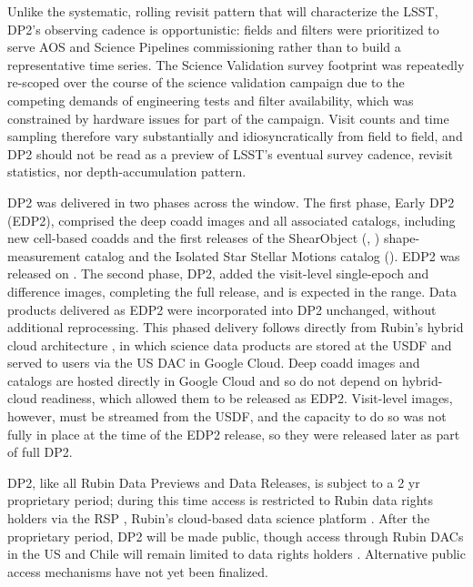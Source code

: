 Unlike the systematic, rolling revisit pattern that will characterize the \gls{LSST}, \gls{DP2}'s observing cadence is opportunistic: fields and filters were prioritized to serve \gls{AOS} and \gls{Science Pipelines} commissioning rather than to build a representative time series.
The Science \gls{Validation} survey footprint was repeatedly re-scoped over the course of the science validation campaign due to the competing demands of engineering tests and filter availability, which was constrained by hardware issues for part of the campaign.
\gls{Visit} counts and time sampling therefore vary substantially and idiosyncratically from field to field, and \gls{DP2} should not be read as a preview of \gls{LSST}'s eventual survey cadence, revisit statistics, nor depth-accumulation pattern.

\gls{DP2} was delivered in two phases across the \dptwodeliverywindow window.
The first phase, Early \gls{DP2} (\gls{EDP2}), comprised the deep coadd images and all associated catalogs, including new cell-based coadds and the first releases of the \gls{ShearObject} (, ) shape-measurement catalog and the Isolated Star Stellar Motions catalog ().
\gls{EDP2} was released on \edptworeleasedate.
The second phase, \gls{DP2}, added the visit-level single-\gls{epoch} and difference images, completing the full release, and is expected in the \dptworeleasedate range.
Data products delivered as \gls{EDP2} were incorporated into \gls{DP2} unchanged, without additional reprocessing.
This phased delivery follows directly from Rubin's hybrid cloud architecture \citep[][]{2024SPIE13101E..2BO}, in which science data products are stored at the \gls{USDF} and served to users via the US \gls{DAC} in Google Cloud.
Deep coadd images and catalogs are hosted directly in Google Cloud and so do not depend on hybrid-cloud readiness, which allowed them to be released as \gls{EDP2}.
Visit-level images, however, must be streamed from the \gls{USDF}, and the capacity to do so was not fully in place at the time of the \gls{EDP2} release, so they were released later as part of full \gls{DP2}.

\gls{DP2}, like all Rubin Data Previews and Data Releases, is subject to a 2 yr proprietary period; during this time access is restricted to Rubin data rights holders \citep[][]{rdo-013} via the \gls{RSP} \citep[][]{LSE-319}, Rubin's cloud-based data science platform \citep[][]{LSE-319}.
After the proprietary period, \gls{DP2} will be made public, though access through Rubin \gls{DAC}s in the US and Chile will remain limited to data rights holders \citep[][]{rdo-013}.
Alternative public access mechanisms have not yet been finalized.

